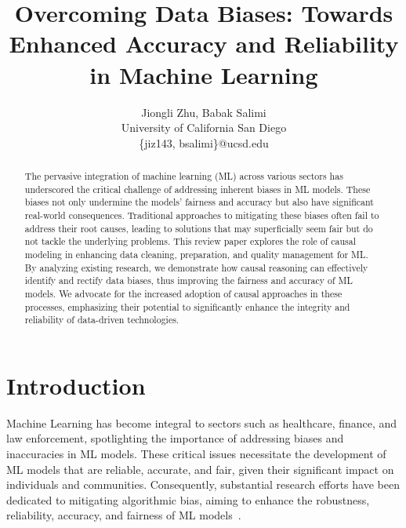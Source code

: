 \documentclass[11pt]{article}
\begin{document}
\title{Overcoming Data Biases: Towards Enhanced Accuracy and Reliability in Machine Learning}
\author{Jiongli Zhu, Babak Salimi\\
University of California San Diego\\
\{jiz143, bsalimi\}@ucsd.edu}

\maketitle

\begin{abstract}

The pervasive integration of machine learning (ML) across various sectors has underscored the critical challenge of addressing inherent biases in ML models. These biases not only undermine the models' fairness and accuracy but also have significant real-world consequences. Traditional approaches to mitigating these biases often fail to address their root causes, leading to solutions that may superficially seem fair but do not tackle the underlying problems. This review paper explores the role of causal modeling in enhancing data cleaning, preparation, and quality management for ML. By analyzing existing research, we demonstrate how causal reasoning can effectively identify and rectify data biases, thus improving the fairness and accuracy of ML models. We advocate for the increased adoption of causal approaches in these processes, emphasizing their potential to significantly enhance the integrity and reliability of data-driven technologies.

\end{abstract}


\section{Introduction}

Machine Learning has become integral to sectors such as healthcare, finance, and law enforcement, spotlighting the importance of addressing biases and inaccuracies in ML models. These critical issues necessitate the development of ML models that are reliable, accurate, and fair, given their significant impact on individuals and communities. Consequently, substantial research efforts have been dedicated to mitigating algorithmic bias, aiming to enhance the robustness, reliability, accuracy, and fairness of ML models~\cite{mehrabi2021survey,balayn2021managing}.
\end{document}
